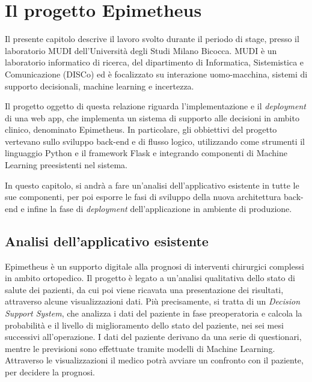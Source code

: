 \chapter{Il progetto Epimetheus}
\label{ch:capitolo2}


Il presente capitolo descrive il lavoro svolto durante il periodo di stage, presso il laboratorio MUDI dell'Università degli Studi Milano Bicocca.
\newline
MUDI è un laboratorio informatico di ricerca, del dipartimento di Informatica, Sistemistica e Comunicazione (DISCo) ed è focalizzato su interazione uomo-macchina, sistemi di supporto decisionali, machine learning e incertezza.

Il progetto oggetto di questa relazione riguarda l'implementazione e il \textit{deployment} di una web app, che implementa un sistema di supporto alle decisioni in ambito clinico, denominato Epimetheus.
\newline
In particolare, gli obbiettivi del progetto vertevano sullo sviluppo back-end e di flusso logico, utilizzando come strumenti il linguaggio Python e il framework Flask e integrando componenti di Machine Learning preesistenti nel sistema.

In questo capitolo, si andrà a fare un'analisi dell'applicativo esistente in tutte le sue componenti, per poi esporre le fasi di sviluppo della nuova architettura back-end e infine la fase di \textit{deployment} dell'applicazione in ambiente di produzione.


\section{Analisi dell'applicativo esistente}
\label{sec:analisiApp}

Epimetheus è un supporto digitale alla prognosi di interventi chirurgici complessi in ambito ortopedico. 
Il progetto è legato a un’analisi qualitativa dello stato di salute dei pazienti, da cui poi viene ricavata una presentazione dei risultati, attraverso alcune visualizzazioni dati.
\newline
Più precisamente, si tratta di un \textit{Decision Support System}, che analizza i dati del paziente in fase preoperatoria e calcola la probabilità e il livello di miglioramento dello stato del paziente, nei sei mesi successivi all'operazione. 
\newline
I dati del paziente derivano da una serie di questionari, mentre le previsioni sono effettuate tramite modelli di Machine Learning.
\newline
Attraverso le visualizzazioni il medico potrà avviare un confronto con il paziente, per decidere la prognosi.

